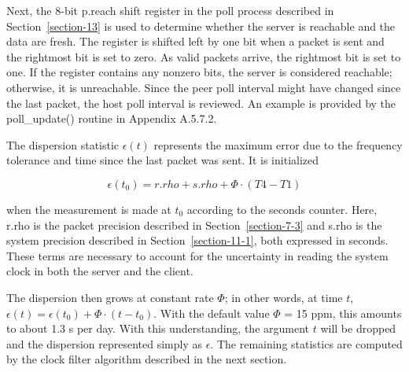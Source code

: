 Next, the 8-bit p.reach shift register in the poll process described
in Section~\ref{section-13} is used to determine whether the server is reachable
and the data are fresh. The register is shifted left by one bit when
a packet is sent and the rightmost bit is set to zero. As valid
packets arrive, the rightmost bit is set to one. If the register
contains any nonzero bits, the server is considered reachable;
otherwise, it is unreachable. Since the peer poll interval might
have changed since the last packet, the host poll interval is
reviewed. An example is provided by the poll\_update() routine in
Appendix A.5.7.2.

The dispersion statistic $ \epsilon(t) $ represents the maximum error due
to the frequency tolerance and time since the last packet was sent.
It is initialized

$$
\epsilon(t_0) = r.rho + s.rho + \Phi \cdot (T4 - T1)
$$

when the measurement is made at $ t_0 $ according to the seconds counter.
Here, r.rho is the packet precision described in Section~\ref{section-7-3} and
s.rho is the system precision described in Section~\ref{section-11-1}, both
expressed in seconds. These terms are necessary to account for the
uncertainty in reading the system clock in both the server and the
client.

The dispersion then grows at constant rate $ \Phi $; in other words, at
time $ t $, $ \epsilon(t) = \epsilon(t_0) + \Phi \cdot (t - t_0) $. With the default
value $ \Phi $ = 15 ppm, this amounts to about 1.3 s per day. With this
understanding, the argument $ t $ will be dropped and the dispersion
represented simply as $ \epsilon $. The remaining statistics are computed
by the clock filter algorithm described in the next section.
